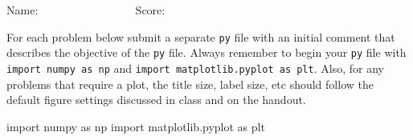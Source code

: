 \documentclass[10pt]{article}
\begin{document}
\vspace{2cm}
\flushright Name: $\qquad \qquad \qquad \qquad $
\flushright Score: $\qquad \qquad \qquad \qquad $

\pagebreak







\flushleft
For each problem below submit a separate \texttt{py} file with an initial comment that describes the objective of the \texttt{py} file.  Always remember to begin your \texttt{py} file with \texttt{import numpy as np} and \verb|import matplotlib.pyplot as plt|.  Also, for any problems that require a plot, the title size, label size, etc should follow the default figure settings discussed in class and on the handout.  


import numpy as np
import matplotlib.pyplot as plt
\end{document}
